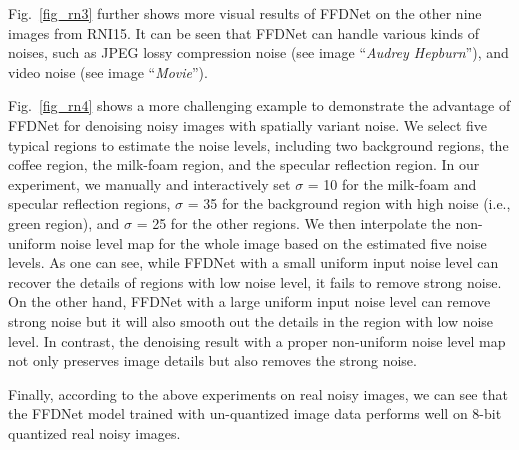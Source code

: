 \documentclass[journal]{IEEEtran}
\begin{document}
Fig.~\ref{fig_rn3} further shows more visual results of FFDNet on the other nine images from RNI15. It can be seen that  FFDNet can handle various kinds of noises, such as JPEG lossy compression noise (see image ``\emph{Audrey Hepburn}''), and video noise (see image ``\emph{Movie}'').



Fig.~\ref{fig_rn4} shows a more challenging example to demonstrate the advantage of FFDNet for denoising noisy images with spatially variant noise.
We select five typical regions to estimate the noise levels, including two background regions, the coffee region, the milk-foam region, and the specular reflection region. In our experiment, we manually and interactively set $\sigma$ = 10 for the milk-foam and specular reflection regions, $\sigma$ = 35 for the background region with high noise (i.e., green region), and $\sigma$ = 25 for the other regions. We then interpolate the non-uniform noise level map for the whole image based on the estimated five noise levels.
As one can see, while FFDNet with a small uniform input noise level can recover the details of regions with low noise level, it fails to remove strong noise. On the other hand, FFDNet with a large uniform input noise level can remove strong noise but it will also smooth out the details in the region with low noise level. In contrast, the denoising result with a proper non-uniform noise level map not only preserves image details but also removes the strong noise.

Finally, according to the above experiments on real noisy images, we can see that the FFDNet model trained with un-quantized image data performs well on 8-bit quantized real noisy images.
\end{document}
